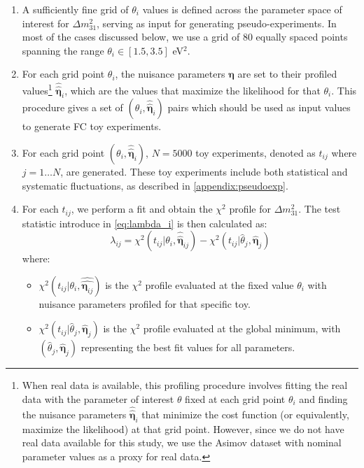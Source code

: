 \begin{enumerate}
    \item A sufficiently fine grid of $\theta_i$ values is defined across the parameter space of interest for $\Delta m_{31}^2$, serving as input for generating pseudo-experiments. In most of the cases discussed below, we use a grid of 80 equally spaced points spanning the range $\theta_i \in [1.5, 3.5]$ eV$^2$.
    \item For each grid point $\theta_i$, the nuisance parameters $\bm{\eta}$ are 
    set to their profiled values\footnote{When real data is available, this 
    profiling procedure involves fitting the real data with the parameter of 
    interest $\theta$ fixed at each grid point $\theta_i$ and finding the nuisance 
    parameters $\hat{\hat{\bm{\eta}}}_i$ that minimize the cost function (or 
    equivalently, maximize the likelihood) at that grid point. However, since we 
    do not have real data available for this study, we use the Asimov dataset with 
    nominal parameter values as a proxy for real data. } 
    $\hat{\hat{\bm{\eta}}}_i$, which are the values that maximize the likelihood 
    for that $\theta_i$. This procedure gives a set of $(\theta_i, 
    \hat{\hat{\bm{\eta}}}_i)$ pairs which should be used as input values to 
    generate FC toy experiments.
    \item For each grid point $(\theta_i, \hat{\hat{\bm{\eta}}}_i)$, $N=5000$ toy experiments, denoted as $t_{ij}$ where $j = 1 \ldots N$, are generated. These toy experiments include both statistical and systematic fluctuations, as described in \autoref{appendix:pseudoexp}.
    \item For each $t_{ij}$, we perform a fit and obtain the $\chi^2$ profile for $\Delta m_{31}^2$. The test statistic introduce in \autoref{eq:lambda_i} is then calculated as:
    \begin{equation}\label{eq:lambda_ij_FC_chi2}
        \lambda_{ij} = \chi^2(t_{ij}|\theta_i, \hat{\hat{\bm{\eta}}}_{ij}) - \chi^2(t_{ij}|\hat{\theta}_j, \hat{\bm{\eta}}_j)
    \end{equation}
    where:
    \begin{itemize}
        \item[-] $\chi^2(t_{ij}|\theta_i, \hat{\hat{\bm{\eta}_{ij}}})$ is the $\chi^2$ profile evaluated at the fixed value $\theta_i$ with nuisance parameters profiled for that specific toy.
        \item[-] $\chi^2(t_{ij}|\hat{\theta}_j, \hat{\bm{\eta}}_j)$ is the $\chi^2$ profile evaluated at the global minimum, with $(\hat{\theta}_j, \hat{\bm{\eta}}_j)$ representing the best fit values for all parameters.

\end{itemize}
\end{enumerate}
